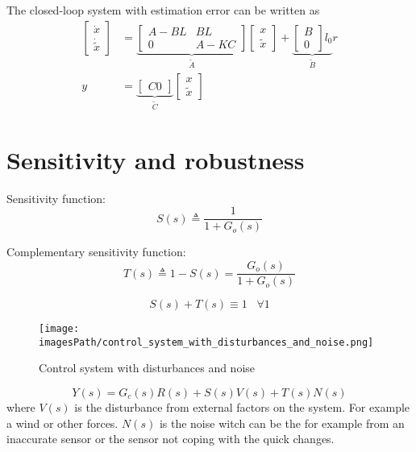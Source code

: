 The closed-loop system with estimation error can be written as 
\begin{align*}
   \begin{bmatrix} \dot{x} \\ \dot{\tilde{x}} \end{bmatrix} &= 
   \underbrace{\begin{bmatrix} A-BL & BL \\ 0 & A-KC \end{bmatrix}}_{\tilde{A}}
   \begin{bmatrix} x \\ \tilde{x} \end{bmatrix} 
   +\underbrace{\begin{bmatrix} B \\ 0 \end{bmatrix}l_0}_{\tilde{B}}r \\
    y &= \underbrace{\begin{bmatrix} C 0 \end{bmatrix}}_{\tilde{C}}
    \begin{bmatrix} x \\ \tilde{x} \end{bmatrix}
\end{align*}

\section{Sensitivity and robustness}
Sensitivity function:
\begin{equation*}
    S(s) \triangleq \frac{1}{1+G_o(s)}
\end{equation*}

Complementary sensitivity function:
\begin{equation*}
    T(s) \triangleq 1-S(s) = \frac{G_o(s)}{1+ G_o(s)}
\end{equation*}

\begin{equation}\label{eq:s_and_t}
    S(s) + T(s) \equiv 1 \;\;\; \forall 1
\end{equation}

\begin{figure}[!h]
    \centering
    \texttt{[image: \\imagesPath/control\_system\_with\_disturbances\_and\_noise.png]}
    \caption{Control system with disturbances and noise}
\end{figure}

\begin{equation*}
    Y(s) = G_c(s)R(s) + S(s)V(s) + T(s)N(s)
\end{equation*}
where $V(s)$ is the disturbance from external factors on the system. For example a wind 
or other forces. $N(s)$ is the noise witch can be the for example from an inaccurate sensor 
or the sensor not coping with the quick changes.

